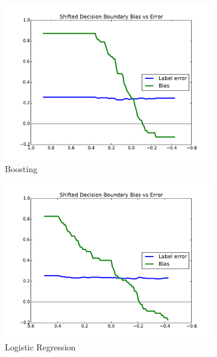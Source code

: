 \documentclass[twoside,leqno,twocolumn]{article}
\begin{document}
\begin{figure}[t]
\centering
\begin{subfigure}{.7\columnwidth}
\includegraphics[width=\columnwidth]{images/german-boosting-T.pdf}%
\caption{Boosting}%
\label{fig:german_boosting_tradeoff}%
\end{subfigure}%
\begin{subfigure}{.7\columnwidth}
\includegraphics[width=\columnwidth]{images/german-lr-T.pdf}%
\caption{Logistic Regression}%
\label{fig:german_lr_tradeoff}%
\end{subfigure}%
\begin{subfigure}{.7\columnwidth}

\end{subfigure}
\end{figure}
\end{document}
